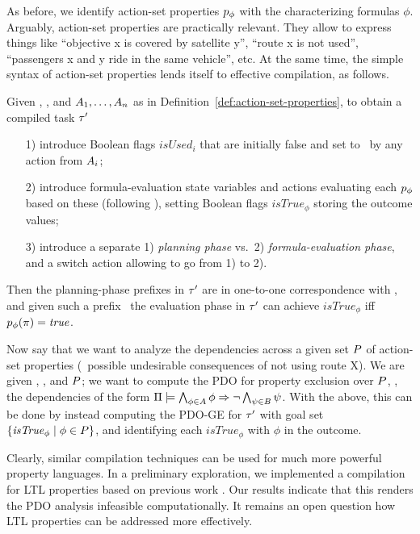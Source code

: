 As before, we identify action-set properties $p_\phi$ with the
characterizing formulas $\phi$. Arguably, action-set properties are
practically relevant. They allow to express things like ``objective x
is covered by satellite y'', %
%
``route x is not used'',
%
``passengers x and y ride in the same vehicle'',
%
etc. At the same time, the simple syntax of action-set
properties lends itself to effective compilation, as follows.

Given \task, \plans, and $A_1, \dots, A_n$ as in
Definition~\ref{def:action-set-properties}, to obtain a compiled task
$\tau'$
\begin{itemize}
\item[1)] introduce Boolean flags $\mathit{isUsed}_i$ that are
  initially false and set to \true\ by any action from $A_i$;
\item[2)] introduce formula-evaluation state variables and actions
  evaluating each $p_\phi$ based on these (following
  \cite{gazen:knoblock:ecp-97,nebel:jair-00}), setting Boolean flags
  $\mathit{isTrue}_\phi$ storing the outcome values;
\item[3)] introduce a separate 1) \emph{planning phase} vs.\ 2)
  \emph{formula-evaluation phase}, and a switch action allowing to go
  from 1) to 2).
\end{itemize}
Then the planning-phase prefixes in $\tau'$ are in one-to-one
correspondence with \plans, and given such a prefix \plan\ the
evaluation phase in $\tau'$ can achieve $\mathit{isTrue}_\phi$ iff
$p_\phi(\pi) = \mathit{true}$.

Now say that we want to analyze the dependencies across a given set
$P$ of action-set properties (\eg\ possible undesirable
consequences of not using route X). We are given \task, \plans, and
$P$; we want to compute the PDO for property exclusion over
$P$, \ie, the dependencies of the form
$\Pi \models \bigwedge_{\phi \in A} \phi \Rightarrow \neg \bigwedge_{\psi
    \in B} \psi$. With the above, this can be done by instead
computing the PDO-GE for $\tau'$ with goal set
$\{\mathit{isTrue}_\phi \mid \phi \in P\}$, and identifying each
$\mathit{isTrue}_\phi$ with $\phi$ in the outcome.

Clearly, similar compilation techniques can be used for much more
powerful property languages. In a preliminary exploration, we
implemented a compilation for LTL properties based on previous work
\cite{edelkamp:icaps-06,baier:etal:ai-09}. Our results indicate that
this renders the PDO analysis infeasible computationally. It remains
an open question how LTL properties can be addressed more effectively.





